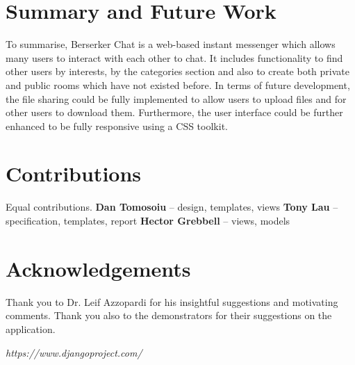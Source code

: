 \documentclass{sig-alt-release2}
\begin{document}
\section{Summary and Future Work}
To summarise, Berserker Chat is a web-based instant messenger which allows many users to interact with each other to chat. It includes functionality to find other users by interests, by the categories section and also to create both private and public rooms which have not existed before.
In terms of future development, the file sharing could be fully implemented to allow users to upload files and for other users to download them. Furthermore, the user interface could be further enhanced to be fully responsive using a CSS toolkit. 

\section{Contributions}
Equal contributions.
\textbf{Dan Tomosoiu} -- design, templates, views 
\textbf{Tony Lau} -- specification, templates, report 
\textbf{Hector Grebbell} -- views, models

\section{Acknowledgements}
Thank you to Dr. Leif Azzopardi for his insightful suggestions and motivating comments. Thank you also to the demonstrators for their suggestions on the application.

\begin{thebibliography}{9}
 \emph{https://www.djangoproject.com/}
\end{thebibliography}



\end{document}

